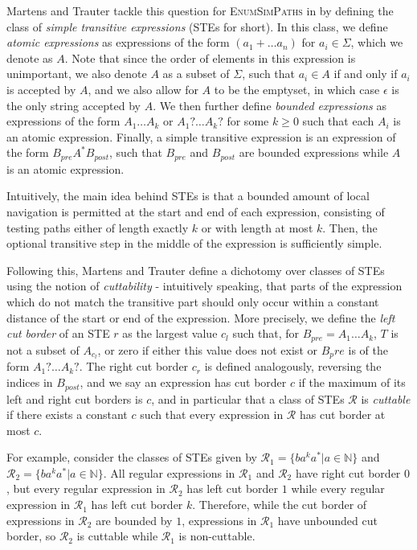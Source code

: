 \documentclass{article}
\begin{document}
Martens and Trauter tackle this question for \textsc{EnumSimPaths} in \cite{martensEvaluationEnumerationProblems2018} by defining the class of \emph{simple transitive expressions} (STEs for short). In this class, we define \emph{atomic expressions} as expressions of the form $(a_1 + \dots a_n)$ for $a_i \in \Sigma$, which we denote as $A$. Note that since the order of elements in this expression is unimportant, we also denote $A$ as a subset of $\Sigma$, such that $a_i \in A$ if and only if $a_i$ is accepted by $A$, and we also allow for $A$ to be the emptyset, in which case $\epsilon$ is the only string accepted by $A$. We then further define \emph{bounded expressions} as expressions of the form $A_1 \dots A_k$ or $A_1 ? \dots A_k ?$ for some $k \geq 0$ such that each $A_i$ is an atomic expression. Finally, a simple transitive expression is an expression of the form $B_{pre}A^* B_{post}$, such that $B_{pre}$ and $B_{post}$ are bounded expressions while $A$ is an atomic expression.

Intuitively, the main idea behind STEs is that a bounded amount of local navigation is permitted at the start and end of each expression, consisting of testing paths either of length exactly $k$ or with length at most $k$. Then, the optional transitive step in the middle of the expression is sufficiently simple.

Following this, Martens and Trauter define a dichotomy over classes of STEs using the notion of \emph{cuttability} - intuitively speaking, that parts of the expression which do not match the transitive part should only occur within a constant distance of the start or end of the expression. More precisely, we define the \emph{left cut border} of an STE $r$ as the largest value $c_l$ such that, for $B_{pre} = A_1 \dots A_k$, $T$ is not a subset of $A_{c_l}$, or zero if either this value does not exist or $B_pre$ is of the form $A_1 ? \dots A_k ?$. The right cut border $c_r$ is defined analogously, reversing the indices in $B_{post}$, and we say an expression has cut border $c$ if the maximum of its left and right cut borders is $c$, and in particular that a class of STEs $\mathcal{R}$ is \emph{cuttable} if there exists a constant $c$ such that every expression in $\mathcal{R}$ has cut border at most $c$.

For example, consider the classes of STEs given by $\mathcal{R}_1 = \{ ba^k a^* | a \in \mathbb{N} \}$ and $\mathcal{R}_2 = \{ ba^k a^* | a \in \mathbb{N} \}$. All regular expressions in $\mathcal{R}_1$ and $\mathcal{R}_2$ have right cut border $0$, but every regular expression in $\mathcal{R}_2$ has left cut border $1$ while every regular expression in $\mathcal{R}_1$ has left cut border $k$. Therefore, while the cut border of expressions in $\mathcal{R}_2$ are bounded by $1$, expressions in $\mathcal{R}_1$ have unbounded cut border, so $\mathcal{R}_2$ is cuttable while $\mathcal{R}_1$ is non-cuttable.
\end{document}
